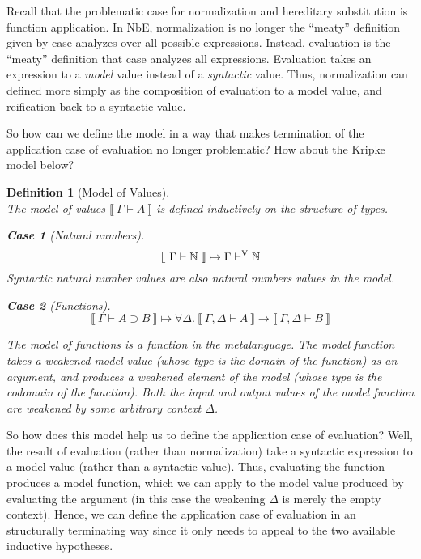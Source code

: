 \documentclass{llncs}
\newtheorem{defin}{Definition}
\newtheorem{subdefin}{Case}
\def\dfn{\mapsto}
\def\arr{\supset}
\def\marr{\rightarrow}
\def\nat{\mathbb{N}}
\newcommand{\turn}[1]{\vdash^\con{#1}}
\newcommand{\all}[1]{\forall#1.~}
\newcommand{\el}[1]{\llbracket ~ #1 ~ \rrbracket}
\newcommand{\con}[1]{\textmd{#1}}
\newcommand{\typm}[1]{\el{\Gamma \vdash #1}}
\newcommand{\gdtypm}[1]{\el{\Gamma, \Delta \vdash #1}}
\newcommand{\typv}[1]{\Gamma \turn{V} #1}
\begin{document}
Recall that the problematic case for normalization and hereditary
substitution is function application. In NbE, normalization is no
longer the ``meaty'' definition given by case analyzes over all
possible expressions. Instead, evaluation is the ``meaty'' definition
that case analyzes all expressions. Evaluation takes an expression
to a \textit{model} value instead of a \textit{syntactic} value.
Thus, normalization can defined more simply as the composition of
evaluation to a model value, and reification back to a syntactic value.

So how can we define the model in a way that makes termination of the
application case of evaluation no longer problematic? How about the
Kripke model below?

\begin{defin}[Model of Values]
\label{def:mval}
$ $\\
The model of values $\typm{A}$ is defined inductively on the structure
of types.

\begin{subdefin}[Natural numbers]
$$
\typm{\nat} \dfn \typv{\nat}
$$
Syntactic natural number values are also natural numbers values in the
model.
\end{subdefin}

\begin{subdefin}[Functions]
$$
\typm{A \arr B} \dfn \all{\Delta} \gdtypm{A} \marr \gdtypm{B}
$$

The model of functions is a function in the metalanguage.
The model function takes a weakened model value (whose type is
the domain of the function) as an argument, and produces a
weakened element of the model (whose type is the codomain of the
function). Both the input and output values of the model function are
weakened by some arbitrary context $\Delta$.
\end{subdefin}

\end{defin}

So how does this model help us to define the application case of
evaluation? Well, the result of evaluation (rather than
normalization) take a syntactic expression to a model value (rather
than a syntactic value).
Thus, evaluating the function produces a model
function, which we can apply to the model value produced by evaluating
the argument (in this case the weakening $\Delta$ is merely the empty
context). Hence, we can define the application case of evaluation in
an structurally terminating way since it only needs to appeal to the
two available inductive hypotheses.
\end{document}
